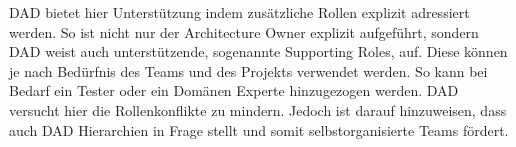 DAD bietet hier Unterstützung indem zusätzliche Rollen explizit adressiert werden. So ist nicht nur der Architecture Owner explizit aufgeführt, sondern DAD weist auch unterstützende, sogenannte Supporting Roles, auf. Diese können je nach Bedürfnis des Teams und des Projekts verwendet werden. So kann bei Bedarf ein Tester oder ein Domänen Experte hinzugezogen werden. DAD versucht hier die Rollenkonflikte zu mindern. Jedoch ist darauf hinzuweisen, dass auch DAD Hierarchien in Frage stellt und somit selbstorganisierte Teams fördert.




	